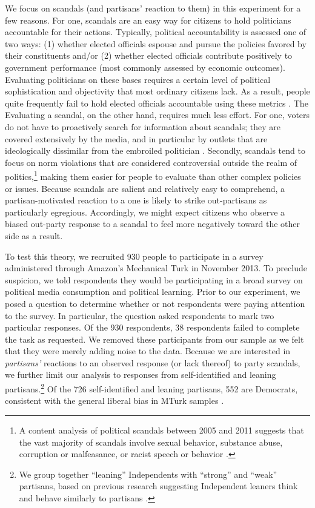 \documentclass[12pt, letterpaper]{article}
\begin{document}
We focus on scandals (and partisans' reaction to them) in this experiment for a few reasons. For one, scandals are an easy way for citizens to hold politicians accountable for their actions. Typically, political accountability is assessed one of two ways:  (1) whether elected officials espouse and pursue the policies favored by their constituents and/or (2) whether elected officials contribute positively to government performance (most commonly assessed by economic outcomes). Evaluating politicians on these bases requires a certain level of political sophistication and objectivity that most ordinary citizens lack. As a result, people quite frequently fail to hold elected officials accountable using these metrics \citep[e.g.,][]{achen2016democracy,Bartels2008,healylenz_2014,Lenz2012,snidermanstiglitz_2012,soodiyengar_2014}. The Evaluating a scandal, on the other hand, requires much less effort. For one, voters do not have to proactively search for information about scandals; they are covered extensively by the media, and in particular by outlets that are ideologically dissimilar from the embroiled politician \citep{budaketal_2016,puglisisnyder_2011}. Secondly, scandals tend to focus on norm violations that are considered controversial outside the realm of politics,\footnote{A content analysis of political scandals between 2005 and 2011 suggests that the vast majority of scandals involve sexual behavior, substance abuse, corruption or malfeasance, or racist speech or behavior \citep{ahlersood_2014}.} making them easier for people to evaluate than other complex policies or issues. Because scandals are salient and relatively easy to comprehend, a partisan-motivated reaction to a one is likely to strike out-partisans as particularly egregious. Accordingly, we might expect citizens who observe a biased out-party response to a scandal to feel more negatively toward the other side as a result. 

To test this theory, we recruited 930 people to participate in a survey administered through Amazon's Mechanical Turk in November 2013. To preclude suspicion, we told respondents they would be participating in a broad survey on political media consumption and political learning. Prior to our experiment, we posed a question to determine whether or not respondents were paying attention to the survey. In particular, the question asked respondents to mark two particular responses. Of the 930 respondents, 38 respondents failed to complete the task as requested. We removed these participants from our sample as we felt that they were merely adding noise to the data. Because we are interested in \textit{partisans'} reactions to an observed response (or lack thereof) to party scandals, we further limit our analysis to responses from self-identified and leaning partisans.\footnote{We group together ``leaning'' Independents with ``strong'' and ``weak'' partisans, based on previous research suggesting Independent leaners think and behave similarly to partisans \citep{keithetal_1992}.} Of the 726 self-identified and leaning partisans, 552 are Democrats, consistent with the general liberal bias in MTurk samples \citep{BerinskyHuberLenz2012}. 
\end{document}
